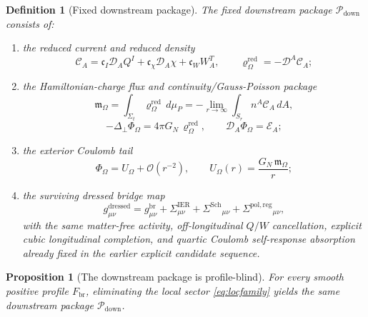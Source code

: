 \documentclass[11pt]{article}
\newcommand{\SpatialD}{\mathcal D}
\newcommand{\LapPerp}{\Delta_\perp}
\newcommand{\FlowPot}{\Phi_\Omega}
\newcommand{\CoulPot}{U_\Omega}
\newcommand{\SourceDensityRed}{\varrho_\Omega^{\mathrm{red}}}
\newcommand{\ConstCurrent}{\mathcal C}
\newcommand{\HamChargeOmega}{\mathfrak m_\Omega}
\newcommand{\SigmaIER}{\Sigma^{\mathrm{IER}}}
\newcommand{\SigmaDressSch}{\Sigma^{\mathrm{Sch}}}
\newcommand{\SigmaRegPol}{\Sigma^{\mathrm{pol,reg}}}
\newcommand{\CurvProfile}{F_{\mathrm{br}}}
\newcommand{\DownPkg}{\mathscr P_{\mathrm{down}}}
\newtheorem{definition}{Definition}
\newtheorem{proposition}{Proposition}
\begin{document}
\begin{definition}[Fixed downstream package]
\label{def:downstream}
The \emph{fixed downstream package} \(\DownPkg\) consists of:
\begin{enumerate}
    \item the reduced current and reduced density
    \begin{equation}
    \ConstCurrent_A
    =
    \mathfrak c_I\SpatialD_AQ^I
    +\mathfrak c_\chi\SpatialD_A\chi
    +\mathfrak c_WW_A^T,
    \qquad
    \SourceDensityRed=-\SpatialD^A\ConstCurrent_A;
    \label{eq:pkgcurrent}
    \end{equation}
    \item the Hamiltonian-charge flux and continuity/Gauss-Poisson package
    \begin{equation}
    \HamChargeOmega
    =
    \int_{\Sigma_t}\SourceDensityRed\,d\mu_P
    =
    -\lim_{r\to\infty}\int_{S_r} n^A\ConstCurrent_A\,dA,
    \label{eq:pkgcharge}
    \end{equation}
    \begin{equation}
    -\LapPerp\FlowPot=4\pi G_N\,\SourceDensityRed,
    \qquad
    \SpatialD_A\FlowPot=\mathcal E_A;
    \label{eq:pkgpoisson}
    \end{equation}
    \item the exterior Coulomb tail
    \begin{equation}
    \FlowPot
    =
    \CoulPot+\mathcal O(r^{-2}),
    \qquad
    \CoulPot(r)=\frac{G_N\,\HamChargeOmega}{r};
    \label{eq:pkgcoul}
    \end{equation}
    \item the surviving dressed bridge map
    \begin{equation}
    g_{\mu\nu}^{\mathrm{dressed}}
    =
    g_{\mu\nu}^{\mathrm{br}}
    +\SigmaIER_{\mu\nu}
    +\SigmaDressSch{}_{\mu\nu}
    +\SigmaRegPol{}_{\mu\nu},
    \label{eq:pkgmetric}
    \end{equation}
    with the same matter-free activity, off-longitudinal \(Q/W\) cancellation, explicit cubic longitudinal completion, and quartic Coulomb self-response absorption already fixed in the earlier explicit candidate sequence.
\end{enumerate}
\end{definition}

\begin{proposition}[The downstream package is profile-blind]
\label{prop:profileblind}
For every smooth positive profile \(\CurvProfile\), eliminating the local sector \eqref{eq:locfamily} yields the same downstream package \(\DownPkg\).
\end{proposition}
\end{document}
